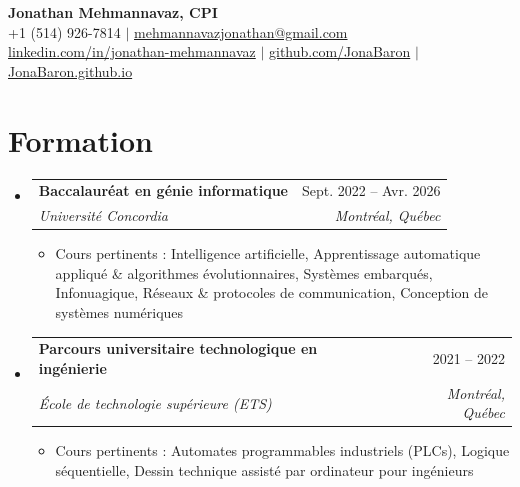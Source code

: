 \documentclass[letterpaper,12pt]{article}
\makeatletter
\newcommand{\resumeItem}[1]{
  \item\small{
    {#1 \vspace{0pt}}
  }
}
\newcommand{\resumeSubheading}[4]{
  \vspace{-2pt}\item
    \begin{tabular*}{0.97\textwidth}[t]{l@{\extracolsep{\fill}}r}
      \textbf{#1} & #2 \\
      \textit{\small#3} & \textit{\small #4} \\
    \end{tabular*}\vspace{-5pt}
}
\newcommand{\resumeSubHeadingListStart}{\begin{itemize}[leftmargin=0.15in, label={}]}
\newcommand{\resumeSubHeadingListEnd}{\end{itemize}}
\newcommand{\resumeItemListStart}{\begin{itemize}[leftmargin=0.2in, label={$\vcenter{\hbox{\scriptsize$\bullet$}}$}, itemsep=2pt, topsep=2pt, parsep=0pt]}
\newcommand{\resumeItemListEnd}{\end{itemize}\vspace{-2pt}}
\makeatother
\begin{document}
\begin{center}
    \textbf{\fontsize{32}{38}\selectfont Jonathan Mehmannavaz, CPI} \\ \vspace{8pt}
    \small +1 (514) 926-7814 $|$
    \href{mailto:mehmannavazjonathan@gmail.com}{mehmannavazjonathan@gmail.com} \\
    \href{https://linkedin.com/in/jonathan-mehmannavaz/}{linkedin.com/in/jonathan-mehmannavaz} $|$
    \href{https://github.com/JonaBaron}{github.com/JonaBaron} $|$
    \href{https://JonaBaron.github.io}{JonaBaron.github.io}
\end{center}

\vspace{18pt}

\section{Formation}
  \resumeSubHeadingListStart
    \resumeSubheading
      {Baccalaur\'{e}at en g\'{e}nie informatique}{Sept. 2022 -- Avr. 2026}
      {Universit\'{e} Concordia}{Montr\'{e}al, Qu\'{e}bec}
      \resumeItemListStart
        \resumeItem{Cours pertinents : Intelligence artificielle, Apprentissage automatique appliqu\'{e} \& algorithmes \'{e}volutionnaires, Syst\`{e}mes embarqu\'{e}s, Infonuagique, R\'{e}seaux \& protocoles de communication, Conception de syst\`{e}mes num\'{e}riques}
      \resumeItemListEnd
    \resumeSubheading
      {Parcours universitaire technologique en ing\'{e}nierie}{2021 -- 2022}
      {\'{E}cole de technologie sup\'{e}rieure (ETS)}{Montr\'{e}al, Qu\'{e}bec}
      \resumeItemListStart
        \resumeItem{Cours pertinents : Automates programmables industriels (PLCs), Logique s\'{e}quentielle, Dessin technique assist\'{e} par ordinateur pour ing\'{e}nieurs}
      \resumeItemListEnd
  \resumeSubHeadingListEnd

\end{document}
